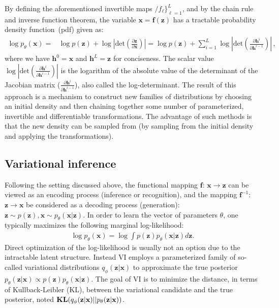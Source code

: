\documentclass{article} %
\begin{document}
By defining the aforementioned invertible maps $/f_{\ell} \}_{\ell =1}^L$, and by the chain rule and inverse function theorem, the variable $\mathbf{x}=\mathbf{f}(\mathbf{z})$ has a tractable probability density function~(pdf) given as:
\begin{align}\label{eq:flow}
\log p_\theta(\mathbf{x}) =& \log p(\mathbf{z})  + \log | \text{det} ( \frac{\partial \mathbf{z} }{\partial \mathbf{x}} ) | 
=  \log p(\mathbf{z}) + \sum_{i=1}^L\log | \text{det} ( \frac{\partial \mathbf{h}^i } {\partial \mathbf{h}^{i-1}}) | \, ,
\end{align}
where we have $\mathbf{h}^0 = \mathbf{x}$ and $\mathbf{h}^L = \mathbf{z}$ for conciseness. 
The scalar value $\log |\text{det}( \frac{\partial \mathbf{h}^i}{\partial \mathbf{h}^{i-1}})|$ is the logarithm of the absolute value of the determinant of the Jacobian matrix ($\frac{\partial \mathbf{h}^i}{ \partial\mathbf{h}^{i-1}}$), also called the log-determinant. 
The result of this approach is a mechanism to construct new families of distributions by choosing an initial density and then chaining together some number of parameterized, invertible and differentiable transformations. 
The advantage of such methods is that the new density can be sampled from (by sampling from the initial density and applying the transformations).

\subsection{Variational inference}
Following the setting discussed above, the functional mapping $\mathbf{f}$: $\mathbf{x} \xrightarrow{} \mathbf{z}$ can be viewed as an encoding process (inference or recognition), and the mapping $\mathbf{f}^{-1}$: $\mathbf{z} \xrightarrow{} \mathbf{x}$ be considered as a decoding process (generation):
$\mathbf{z} \sim p(\mathbf{z}), \mathbf{x} \sim p_\theta(\mathbf{x}|\mathbf{z}).$
In order to learn the vector of parameters $\theta$, one typically maximizes the following marginal log-likelihood:
\begin{align*}
    \log p_\theta(\mathbf{x}) = \log \int p(\mathbf{z})  p_\theta(\mathbf{x}|\mathbf{z})d\mathbf{z}.
\end{align*}
Direct optimization of the log-likelihood is usually not an option due to the intractable latent structure. Instead VI employs a parameterized family of so-called variational distributions $q_\phi(\mathbf{z}|\mathbf{x})$ to approximate the true posterior $p_\theta(\mathbf{z}|\mathbf{x}) \varpropto  p(\mathbf{z})  p_\theta(\mathbf{x}|\mathbf{z})$.
The goal of VI is to minimize the distance, in terms of Kullback-Leibler (KL), between the variational candidate and the true posterior, noted $\textbf{\text{KL}}(q_\phi(\mathbf{z}|\mathbf{x})||p_\theta(\mathbf{z}|\mathbf{x}) )$.
\end{document}
